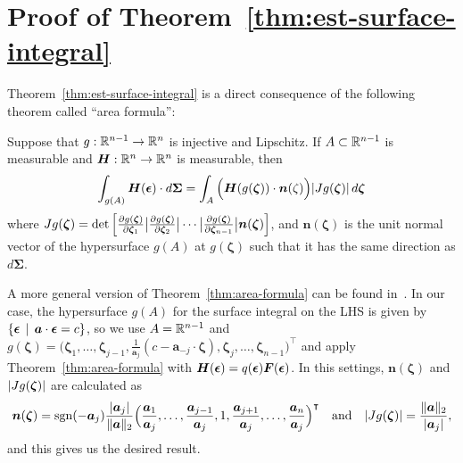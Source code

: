 \section{Proof of Theorem~\ref{thm:est-surface-integral}}
%
%
Theorem~\ref{thm:est-surface-integral}
is a direct consequence of the  following theorem called ``area formula'':
\begin{theorem}
  \label{thm:area-formula}
  Suppose that $g: \mathbb{R}^{n-1} \to \mathbb{R}^n$ is injective and Lipschitz.
  If $A \subset \mathbb{R}^{n-1}$ is measurable and $\bm H : \mathbb{R}^n \to \mathbb{R}^n$ is measurable,
  then
  $$
  \int_{g(A)} \bm H(\bm {\epsilon}) \cdot d\bm{\Sigma}
  =
  \int_A \Big(\bm H(g(\bm \zeta)) \cdot \bm{n}(\zeta)\Big) \abs{Jg(\bm \zeta)} \, d\bm\zeta
  $$
  where $Jg(\bm \zeta) =
  \det \Big[ \pdv{g(\bm \zeta)}{\bm{\zeta}_1} \big| \pdv{g(\bm \zeta)}{\bm{\zeta}_2} \big|
    \cdots \big| \pdv{g(\bm \zeta)}{\bm{\zeta}_{n-1}} \big| \bm n(\bm \zeta) \Big]$,
  and $\bm n(\bm \zeta)$ is the unit normal vector of the hypersurface $g(A)$
  at $g(\bm \zeta)$ such that it has the same direction as $d\bm{\Sigma}$.
\end{theorem}
A more general version of Theorem~\ref{thm:area-formula}
can be found in~\cite{DiaconisMainfold13}.
In our case,
the hypersurface $g(A)$ for the surface integral on the LHS
is given by $\{\bm{\epsilon} \,\mid\, \bm{a}\cdot\bm{\epsilon}=c \}$,
so we use $A=\mathbb{R}^{n-1}$ and
$g(\bm{\zeta}) = \big(\bm{\zeta}_1,\ldots,\bm{\zeta}_{j-1},
\frac{1}{\bm{a}_j}(c-\bm{a}_{-j}\cdot\bm{\zeta}),
\bm{\zeta}_{j},\ldots,\bm{\zeta}_{n-1}\big)^\intercal$
and apply Theorem~\ref{thm:area-formula} with $\bm{H}(\bm{\epsilon}) = q(\bm{\epsilon})\bm{F}(\bm{\epsilon})$.
In this settings,
$\bm{n}(\bm{\zeta})$ and $\abs{Jg(\bm{\zeta})}$ are calculated as
$$
\bm{n}(\bm{\zeta}) = \mathrm{sgn}({-\bm{a}_j}) \frac{\abs{\bm{a}_j}}{\|\bm{a}\|_2}
 \Big(\frac{\bm{a}_1}{\bm{a}_j},\ldots,\frac{\bm{a}_{j-1}}{\bm{a}_j},1,\frac{\bm{a}_{j+1}}{\bm{a}_j},\ldots,\frac{\bm{a}_n}{\bm{a}_j}\Big)^\intercal
\quad\text{and}\quad
\abs{Jg(\bm{\zeta})} = \frac{\|\bm{a}\|_2}{\abs{\bm{a}_j}},
$$
and this gives us the desired result.
